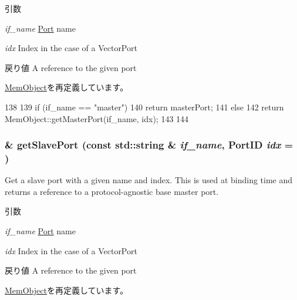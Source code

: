 \begin{DoxyParams}{引数}
\item[{\em if\_\-name}]\hyperlink{classPort}{Port} name \item[{\em idx}]Index in the case of a VectorPort\end{DoxyParams}
\begin{DoxyReturn}{戻り値}
A reference to the given port 
\end{DoxyReturn}


\hyperlink{classMemObject_adc4e675e51defbdd1e354dac729d0703}{MemObject}を再定義しています。


\begin{DoxyCode}
138 {
139     if (if_name == "master") {
140         return masterPort;
141     } else {
142         return MemObject::getMasterPort(if_name, idx);
143     }
144 }
\end{DoxyCode}
\hypertarget{classCommMonitor_ac918a145092d7514ebc6dbd952dceafb}{
\subsubsection[{getSlavePort}]{ \& getSlavePort (const std::string \& {\em if\_\-name}, \/  {\bf PortID} {\em idx} = {})}}
\label{classCommMonitor_ac918a145092d7514ebc6dbd952dceafb}
Get a slave port with a given name and index. This is used at binding time and returns a reference to a protocol-\/agnostic base master port.


\begin{DoxyParams}{引数}
\item[{\em if\_\-name}]\hyperlink{classPort}{Port} name \item[{\em idx}]Index in the case of a VectorPort\end{DoxyParams}
\begin{DoxyReturn}{戻り値}
A reference to the given port 
\end{DoxyReturn}


\hyperlink{classMemObject_ac918a145092d7514ebc6dbd952dceafb}{MemObject}を再定義しています。


